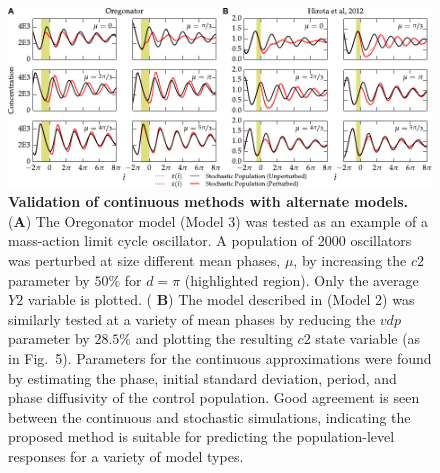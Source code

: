 \documentclass[11pt, letterpaper]{article}
\begin{document}
\begin{figure}[h!]
  \begin{center}
    \includegraphics[width=\textwidth]{figures/figure_S3.pdf}
    \caption{{\bfseries Validation of continuous methods with alternate
    models.} ({\bfseries A}) The Oregonator model (Model 3) was tested as an
    example of a mass-action limit cycle oscillator. A population of 2000
    oscillators was perturbed at size different mean phases, $\mu$, by
    increasing the $\mathit{c2}$ parameter by $50\%$ for $d=\pi$ (highlighted
    region). Only the average $\mathit{Y2}$ variable is plotted. ({\bfseries
    B}) The model described in \cite{Hirota2012} (Model 2) was similarly tested
    at a variety of mean phases by reducing the $\mathit{vdp}$ parameter by
    $28.5\%$ and plotting the resulting $\mathit{c2}$ state variable (as in
    Fig.~5). Parameters for the continuous approximations were found by
    estimating the phase, initial standard deviation, period, and phase
    diffusivity of the control population. Good agreement is seen between the
  continuous and stochastic simulations, indicating the proposed method is
suitable for predicting the population-level responses for a variety of model
types.}
\end{center}
\end{figure}
\end{document}
